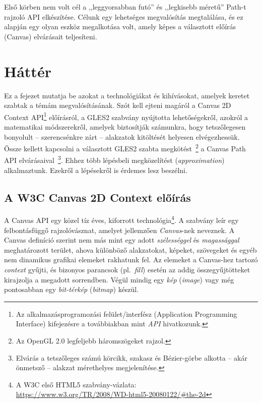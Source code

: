 \documentclass[12pt]{report}
\theoremstyle{definition}
\newcommand{\inenglish}[1]{\textsl{#1}}
\begin{document}
  Első körben nem volt cél a ,,leggyorsabban futó'' és ,,legkisebb méretű''
Path-t rajzoló API elkészítése. Célunk egy lehetséges megvalósítás megtalálása,
és ez alapján egy olyan eszköz megalkotása volt, amely képes a választott
előírás (Canvas) elvárásait teljesíteni.



    \chapter{Háttér}
    \label{Háttér}

  Ez a fejezet mutatja be azokat a technológiákat és kihívásokat,
amelyek keretet szabtak a témám megvalósításának. Szót kell ejteni magáról a
Canvas 2D Context API\footnote{Az alkalmazásprogramozási felület/interfész
(Application Programming Interface) kifejezésre a továbbiakban mint \emph{API}
hivatkozunk.} előírásról, a GLES2 szabvány nyújtotta lehetőségekről, azokról a
matematikai módszerekről, amelyek biztosítják számunkra, hogy tetszőlegesen
bonyolult -- szerencsénkre zárt -- alakzatok kitöltését helyesen elvégezhessük.
Össze kellett kapcsolni a választott GLES2 szabta megkötést~\footnote { Az
OpenGL 2.0 legfeljebb háromszögeket rajzol. } a Canvas Path API
elvárásaival~\footnote { Elvárás a tetszőleges számú körcikk, szakasz és
Bézier-görbe alkotta -- akár önmetsző -- alakzat mérethelyes megjelenítése. }.
Ehhez több lépésbeli megközelítést (\inenglish{approximation}) alkalmaztunk.
Ezekről a lépésekről is érdemes lesz beszélni.

    \section[A Canvas előírás]{A W3C Canvas 2D Context előírás}
    \label{A Canvas előírás}

  A Canvas API egy közel tíz éves, kiforrott technológia\footnote {A W3C első
HTML5 szabvány-vázlata:\\ \footnotesize{
\url{https://www.w3.org/TR/2008/WD-html5-20080122/\#the-2d}} }. A szabvány leír
egy felbontásfüggő rajzolóvásznat, amelyet jellemzően \emph{Canvas}-nek
neveznek. A Canvas definíció szerint nem más mint egy adott \emph{szélességgel}
és \emph{magassággal} meghatározott terület, ahova különböző alakzatokat,
képeket, szövegeket és egyéb nem dinamikus grafikai elemeket rakhatunk fel. Az
elemeket a Canvas-hez tartozó \emph{context} gyűjti, és bizonyos parancsok
(pl.~\emph{fill}) esetén az addig összegyűjtötteket kirajzolja a megadott
sorrendben. Végül mindig egy \emph{kép} (\inenglish{image}) vagy még
pontosabban egy \emph{bit-térkép} (\inenglish{bitmap}) készül.
\end{document}
